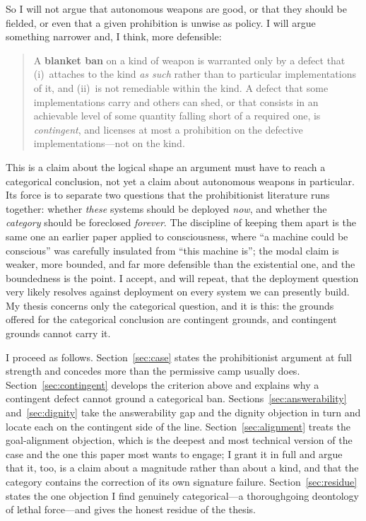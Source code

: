 \documentclass[11pt]{article}
\begin{document}
So I will not argue that autonomous weapons are good, or that they should be fielded, or even that a given prohibition is unwise as policy. I will argue something narrower and, I think, more defensible:

\begin{quote}
A \textbf{blanket ban} on a kind of weapon is warranted only by a defect that (i)~attaches to the kind \emph{as such} rather than to particular implementations of it, and (ii)~is not remediable within the kind. A defect that some implementations carry and others can shed, or that consists in an achievable level of some quantity falling short of a required one, is \emph{contingent}, and licenses at most a prohibition on the defective implementations---not on the kind.
\end{quote}

This is a claim about the logical shape an argument must have to reach a categorical conclusion, not yet a claim about autonomous weapons in particular. Its force is to separate two questions that the prohibitionist literature runs together: whether \emph{these} systems should be deployed \emph{now}, and whether the \emph{category} should be foreclosed \emph{forever}. The discipline of keeping them apart is the same one an earlier paper applied to consciousness, where ``a machine could be conscious'' was carefully insulated from ``this machine is''; the modal claim is weaker, more bounded, and far more defensible than the existential one, and the boundedness is the point. I accept, and will repeat, that the deployment question very likely resolves against deployment on every system we can presently build. My thesis concerns only the categorical question, and it is this: the grounds offered for the categorical conclusion are contingent grounds, and contingent grounds cannot carry it.

I proceed as follows. Section~\ref{sec:case} states the prohibitionist argument at full strength and concedes more than the permissive camp usually does. Section~\ref{sec:contingent} develops the criterion above and explains why a contingent defect cannot ground a categorical ban. Sections~\ref{sec:answerability} and~\ref{sec:dignity} take the answerability gap and the dignity objection in turn and locate each on the contingent side of the line. Section~\ref{sec:alignment} treats the goal-alignment objection, which is the deepest and most technical version of the case and the one this paper most wants to engage; I grant it in full and argue that it, too, is a claim about a magnitude rather than about a kind, and that the category contains the correction of its own signature failure. Section~\ref{sec:residue} states the one objection I find genuinely categorical---a thoroughgoing deontology of lethal force---and gives the honest residue of the thesis.
\end{document}
